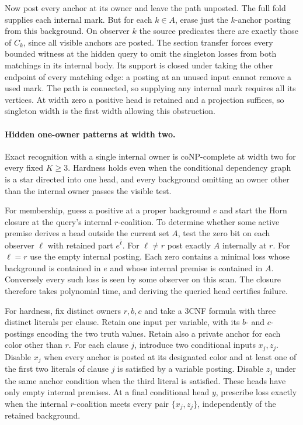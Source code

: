 Now post every anchor at its owner and leave
the path unposted. The full fold supplies each
internal mark. But for each $k\in A$, erase
just the $k$-anchor posting from this
background. On observer $k$ the source
predicates there are exactly those of $C_k$,
since all visible anchors are posted. The
section transfer forces every bounded witness
at the hidden query to omit the singleton
losses from both matchings in its internal
body. Its support is closed under taking
the other endpoint of every matching edge:
a posting at an unused input cannot remove
a used mark. The path is connected, so
supplying any internal mark requires all its
vertices. At width zero a positive head is
retained and a projection suffices, so
singleton width is the first width allowing
this obstruction.

\paragraph{Hidden one-owner patterns at width two.}
Exact recognition with a single internal owner is
coNP-complete at width two for every fixed $K\geq3$.
Hardness holds even when the conditional dependency
graph is a star directed into one head, and every
background omitting an owner other than the internal
owner passes the visible test.

For membership, guess a positive at a proper
background $e$ and start the Horn closure at the
query's internal $r$-coalition. To determine whether
some active premise derives a head outside the current
set $A$, test the zero bit on each observer $\ell$
with retained part $e^{\widehat\ell}$. For $\ell\ne r$
post exactly $A$ internally at $r$. For $\ell=r$
use the empty internal posting. Each zero contains a
minimal loss whose background is contained in $e$ and
whose internal premise is contained in $A$. Conversely
every such loss is seen by some observer on this scan.
The closure therefore takes polynomial time, and
deriving the queried head certifies failure.

For hardness, fix distinct owners $r,b,c$ and take a
3CNF formula with three distinct literals per clause.
Retain one input per variable, with its $b$- and
$c$-postings encoding the two truth values. Retain
also a private anchor for each color other than $r$.
For each clause $j$, introduce two conditional inputs
$x_j,z_j$. Disable $x_j$ when every anchor is posted
at its designated color and at least one of the
first two literals of clause $j$ is satisfied by a
variable posting. Disable $z_j$ under the same
anchor condition when the third literal is satisfied.
These heads have only empty internal premises.
At a final conditional head $y$, prescribe loss
exactly when the internal $r$-coalition meets every
pair $\{x_j,z_j\}$, independently of the retained
background.


